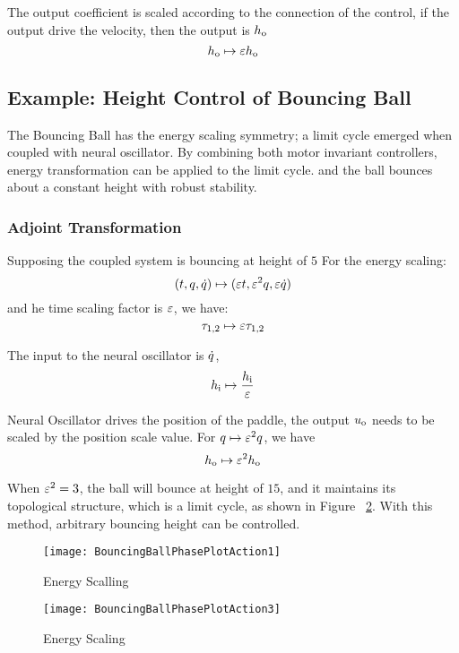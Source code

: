 The output coefficient is scaled according to the connection of the control, 
if the output drive the velocity, then the output is $h_{\mathrm{o}}$
\[
h_{\mathrm{o}} \mapsto \varepsilon h_{\mathrm{o}}
\]




\subsection{Example: Height Control of Bouncing Ball}

The Bouncing Ball has the energy scaling symmetry; a limit cycle emerged when coupled with neural oscillator.
By combining both motor invariant controllers, energy transformation can be applied to the limit cycle.
and the ball  bounces about a constant height with robust stability.

\subsubsection*{Adjoint Transformation}
Supposing the coupled system is bouncing at height of $5$
For the energy scaling:
\[
(t,q,\dot{q} ) \mapsto ( \varepsilon t ,\varepsilon^2 q,\varepsilon \dot{q})
\]
and he time scaling factor is $\varepsilon$, we have:
\[
\tau_{1,2} \mapsto \varepsilon \tau_{1,2}
\]

The input to the neural oscillator is $\dot{q}$,
\[
h_{\mathrm{i}} \mapsto \frac{h_{\mathrm{i}}}{\varepsilon}
\]
 
Neural Oscillator drives the position of the paddle, the output $u_{\mathrm{o}}$ needs to be scaled by the position scale value.
For $q \mapsto \varepsilon^2q$, we have
\[
 h_{\mathrm{o}} \mapsto \varepsilon^2 h_{\mathrm{o}}
\]

When $\varepsilon^2=3$,  the ball will bounce at height of $15$, and it maintains its topological structure, which is a limit cycle, as shown in Figure ~\ref{fig:energy3}. 
With this method, arbitrary bouncing height can be controlled.


\begin{figure}[!htbp]
  \begin{center}
   	\texttt{[image: BouncingBallPhasePlotAction1]}
    \caption{Energy Scalling}
    \label{fig:energy1}
  \end{center}
\end{figure} 


\begin{figure}[!htbp]
  \begin{center}
	\texttt{[image: BouncingBallPhasePlotAction3]}
    \caption{Energy Scaling}
    \label{fig:energy3}
  \end{center}
\end{figure}

